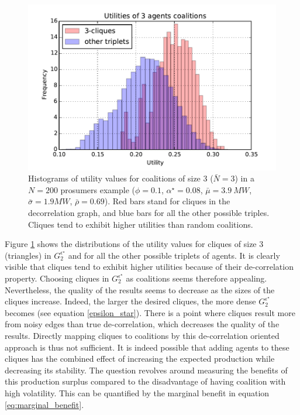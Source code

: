 \documentclass[journal]{IEEEtran}
\begin{document}
\begin{figure}
\includegraphics[scale=.48]{./figs/figure_3}
\caption{{\footnotesize Histograms of utility values for coalitions of size 3 ($\bar{N}=3$) in a $N=200$ prosumers example ($\phi = 0.1$, $ \alpha^{\star} = 0.08 $, $ \bar{\mu}=3.9\ MW $, $\bar{\sigma} = 1.9 MW $, $ \bar{\rho} = 0.69 $). Red bars stand for cliques in the decorrelation graph, and blue bars for all the other possible triples. Cliques tend to exhibit higher utilities than random coalitions.}}
\label{fig:histo_cliques}
\end{figure}

Figure \ref{fig:histo_cliques} shows the distributions of the utility values for cliques of size 3 (triangles) in $ G_{2}^{\epsilon^{\star}} $ and for all the other possible triplets of agents. It is clearly visible that cliques tend to exhibit higher utilities because of their de-correlation property. Choosing cliques in $ G_{2}^{\epsilon^{\star}} $ as coalitions seems therefore appealing. Nevertheless, the quality of the results seems to decrease as the sizes of the cliques increase. Indeed, the larger the desired cliques, the more dense $ G_{2}^{\epsilon^{\star}} $ becomes (see equation \ref{epsilon_star}). There is a point where cliques result more from noisy edges than true de-correlation, which decreases the quality of the results. Directly mapping cliques to coalitions by this de-correlation oriented approach is thus not sufficient. It is indeed possible that adding agents to these cliques has the combined effect of increasing the expected production while decreasing its stability. The question revolves around measuring the benefits of this production surplus compared to the disadvantage of having coalition with high volatility. This can be quantified by the marginal benefit in equation \ref{eq:marginal_benefit}.
\end{document}
